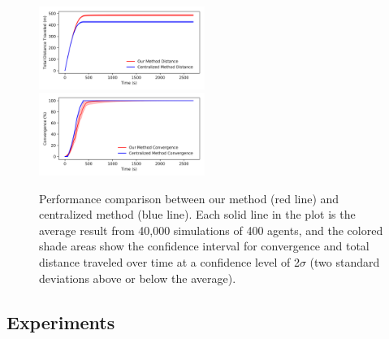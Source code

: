 \documentclass[journal]{IEEEtran}
\begin{document}
\begin{figure}[h!]
\includegraphics[trim=10pt 10pt 10pt 5pt, clip,width=0.48\textwidth]{IEEEtran/comparison/comparison_tro_dis.png}\\
\includegraphics[trim=10pt 10pt 10pt 5pt, clip,width=0.48\textwidth]{IEEEtran/comparison/comparison_tro.png}
\caption{Performance comparison between our method (red line) and centralized method (blue line). Each solid line in the plot is the average result from 40,000 simulations of 400 agents, and the colored shade areas show the confidence interval for convergence and total distance traveled over time at a confidence level of 2$\sigma$ (two standard deviations above or below the average).}
\label{fig:1222}
\end{figure}

\subsection{Experiments}
\end{document}
